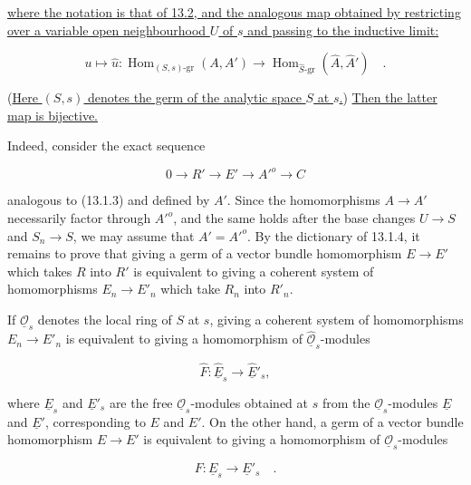 \noindent
\underline{where the notation is that of 13.2, and the analogous map
obtained by restricting over a variable open neighbourhood $U$ of $s$
and passing to the inductive limit:}

\begin{equation}\tag{13.2.1.1}
 u\longmapsto\widehat u:
 \operatorname{Hom}_{(S,s)\text{-}\mathrm{gr}}(A,A')
 \longrightarrow
 \operatorname{Hom}_{\widehat S\text{-}\mathrm{gr}}
   (\widehat A,\widehat {A}')\quad .
\end{equation}

\noindent
(\underline{Here $(S,s)$ denotes the germ of the analytic space $S$ at
$s$.}) \underline{Then the latter map is bijective.}

Indeed, consider the exact sequence

\begin{equation*}
 0\longrightarrow R'\longrightarrow E'\longrightarrow {A'}^o
 \longrightarrow C
\end{equation*}

\noindent
analogous to (13.1.3) and defined by $A'$. Since the homomorphisms
$A\longrightarrow A'$ necessarily factor through ${A'}^o$, and the same
holds after the base changes $U\longrightarrow S$ and
$S_n\longrightarrow S$, we may assume that $A'={A'}^o$. By the
dictionary of 13.1.4, it remains to prove that giving a germ of a vector
bundle homomorphism $E\longrightarrow E'$ which takes $R$ into $R'$ is
equivalent to giving a coherent system of homomorphisms
$E_n\longrightarrow E'_n$ which take $R_n$ into $R'_n$.

If $\underline{\mathcal O}_s$ denotes the local ring of $S$ at $s$,
giving a coherent system of homomorphisms
$E_n\longrightarrow E'_n$ is equivalent to giving a homomorphism of
$\widehat{\underline{\mathcal O}}_s$-modules

\begin{equation*}
 \widehat F:\widehat{\underline E}_s
 \longrightarrow\widehat{\underline E}'_s,
\end{equation*}

\noindent
where $\underline E_s$ and $\underline E'_s$ are the free
$\underline{\mathcal O}_s$-modules obtained at $s$ from the
$\underline{\mathcal O}_s$-modules $\underline E$ and $\underline E'$,
corresponding to $E$ and $E'$. On the other hand, a germ of a vector
bundle homomorphism $E\longrightarrow E'$ is equivalent to giving a
homomorphism of $\underline{\mathcal O}_s$-modules

\begin{equation*}
 F:\underline E_s\longrightarrow\underline E'_s\quad .
\end{equation*}

